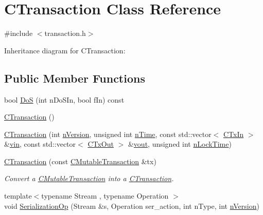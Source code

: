 \hypertarget{class_c_transaction}{}\section{C\+Transaction Class Reference}
\label{class_c_transaction}


{\ttfamily \#include $<$transaction.\+h$>$}



Inheritance diagram for C\+Transaction\+:
\subsection*{Public Member Functions}
\begin{DoxyCompactItemize}
\item 
bool \hyperlink{class_c_transaction_a52eaee52d8827b7265f9dcd308b2a812}{Do\+S} (int n\+Do\+S\+In, bool f\+In) const 
\item 
\hyperlink{class_c_transaction_a41717180530fca69eb0163c1024ae286}{C\+Transaction} ()
\item 
\hyperlink{class_c_transaction_a6f91dd80b9f92ce99185d55b59dbce13}{C\+Transaction} (int \hyperlink{class_c_transaction_a6c29bdd822859c7b21b7b6c22dca6825}{n\+Version}, unsigned int \hyperlink{class_c_transaction_a8ccb4b6020669bc562095e3417715e41}{n\+Time}, const std\+::vector$<$ \hyperlink{class_c_tx_in}{C\+Tx\+In} $>$ \&\hyperlink{class_c_transaction_a53fa787e4ea57374b4fa2a28e9a957b2}{vin}, const std\+::vector$<$ \hyperlink{class_c_tx_out}{C\+Tx\+Out} $>$ \&\hyperlink{class_c_transaction_ae42c0032a464c3054c508017c7d040ef}{vout}, unsigned int \hyperlink{class_c_transaction_ab01e4e451d2f3f84b01380979c8fdacc}{n\+Lock\+Time})
\item 
\hyperlink{class_c_transaction_a6607e95af3e2851ee3b7fe335a05eb4c}{C\+Transaction} (const \hyperlink{struct_c_mutable_transaction}{C\+Mutable\+Transaction} \&tx)
\begin{DoxyCompactList}\small\item\em Convert a \hyperlink{struct_c_mutable_transaction}{C\+Mutable\+Transaction} into a \hyperlink{class_c_transaction}{C\+Transaction}. \end{DoxyCompactList}\item 
{\footnotesize template$<$typename Stream , typename Operation $>$ }\\void \hyperlink{class_c_transaction_aa79659fab1e973a058494393209b0a59}{Serialization\+Op} (Stream \&s, Operation ser\+\_\+action, int n\+Type, int \hyperlink{class_c_transaction_a6c29bdd822859c7b21b7b6c22dca6825}{n\+Version})

\end{DoxyCompactItemize}
